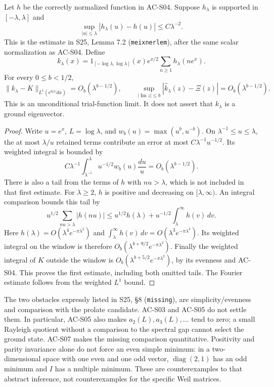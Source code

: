 \begin{proposition}
\label{AC-S13}
Let \(h\) be the correctly normalized function in AC-S04.  Suppose
\(h_\lambda\) is supported in \([-\lambda,\lambda]\) and
\[
 \sup_{|u|\leq\lambda}|h_\lambda(u)-h(u)|\leq C\lambda^{-2}.
\]
This is the estimate in S25, Lemma 7.2 (\texttt{meixnerlem}), after
the same scalar normalization as AC-S04.  Define
\[
 k_\lambda(x)=1_{[-\log\lambda,\log\lambda]}(x)e^{x/2}
                        \sum_{n\geq1}h_\lambda(ne^x).
\]
For every \(0\leq b<1/2\),
\[
 \|k_\lambda-K\|_{L^1(e^{b|x|}dx)}
      =O_b(\lambda^{b-1/2}),\qquad
 \sup_{|\operatorname{Im}z|\leq b}
          |\widehat k_\lambda(z)-\Xi(z)|
      =O_b(\lambda^{b-1/2}).
\]
This is an unconditional trial-function limit.  It does not assert
that \(k_\lambda\) is a ground eigenvector.
\end{proposition}
\begin{proof}
Write \(u=e^x\), \(L=\log\lambda\), and
\(w_b(u)=\max(u^b,u^{-b})\).  On \(\lambda^{-1}\leq u\leq\lambda\),
the at most \(\lambda/u\) retained terms contribute an error at most
\(C\lambda^{-1}u^{-1/2}\).  Its weighted integral is bounded by
\[
 C\lambda^{-1}\int_{\lambda^{-1}}^\lambda
          u^{-1/2}w_b(u)\frac{du}{u}
       =O_b(\lambda^{b-1/2}).
\]
There is also a tail from the terms of \(h\) with \(nu>\lambda\),
which is not included in that first estimate.  For \(\lambda\geq2\),
\(h\) is positive and decreasing on \([\lambda,\infty)\).
An integral comparison bounds this tail by
\[
 u^{1/2}\sum_{nu>\lambda}|h(nu)|
 \leq u^{1/2}h(\lambda)+u^{-1/2}\int_\lambda^\infty h(v)\,dv.
\]
Here \(h(\lambda)=O(\lambda^4e^{-\pi\lambda^2})\) and
\(\int_\lambda^\infty h(v)\,dv=O(\lambda^3e^{-\pi\lambda^2})\).
Its weighted integral on the window is therefore
\(O_b(\lambda^{b+9/2}e^{-\pi\lambda^2})\).
Finally the weighted integral of \(K\) outside the window is
\(O_b(\lambda^{b+5/2}e^{-\pi\lambda^2})\), by its evenness and
AC-S04.  This proves the first estimate, including both omitted tails.
The Fourier estimate follows from the weighted \(L^1\) bound.
\end{proof}

The two obstacles expressly listed in S25, \S8 (\texttt{missing}),
are simplicity/evenness and comparison with the prolate candidate.
AC-S03 and AC-S05 do not settle them.  In particular, AC-S05 also
makes \(a_2(L),a_3(L),\ldots\) tend to zero; a small Rayleigh quotient
without a comparison to the spectral gap cannot select the ground
state.  AC-S07 makes the missing comparison quantitative.  Positivity
and parity invariance alone do not force an even simple minimum:
in a two-dimensional space with one even and one odd vector,
\(\operatorname{diag}(2,1)\) has an odd minimum and \(I\) has a
multiple minimum.  These are counterexamples to that abstract
inference, not counterexamples for the specific Weil matrices.

